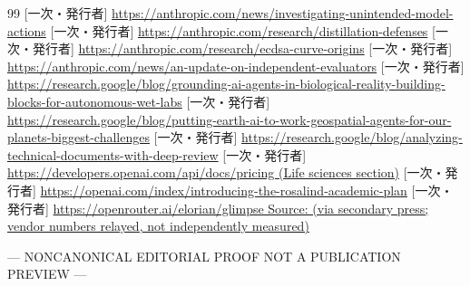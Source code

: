 \documentclass[lualatex,a4paper,10pt]{jlreq}
\begin{document}
\begin{thebibliography}{99}
 [一次・発行者] \url{https://anthropic.com/news/investigating-unintended-model-actions}
 [一次・発行者] \url{https://anthropic.com/research/distillation-defenses}
 [一次・発行者] \url{https://anthropic.com/research/ecdsa-curve-origins}
 [一次・発行者] \url{https://anthropic.com/news/an-update-on-independent-evaluators}
 [一次・発行者] \url{https://research.google/blog/grounding-ai-agents-in-biological-reality-building-blocks-for-autonomous-wet-labs}
 [一次・発行者] \url{https://research.google/blog/putting-earth-ai-to-work-geospatial-agents-for-our-planets-biggest-challenges}
 [一次・発行者] \url{https://research.google/blog/analyzing-technical-documents-with-deep-review}
 [一次・発行者] \url{https://developers.openai.com/api/docs/pricing (Life sciences section)}
 [一次・発行者] \url{https://openai.com/index/introducing-the-rosalind-academic-plan}
 [一次・発行者] \url{https://openrouter.ai/elorian/glimpse Source: (via secondary press; vendor numbers relayed, not independently measured)}
\end{thebibliography}

\begin{center}\color{SurveyMuted}--- NONCANONICAL EDITORIAL PROOF \quad NOT A PUBLICATION PREVIEW ---\end{center}
\end{document}
